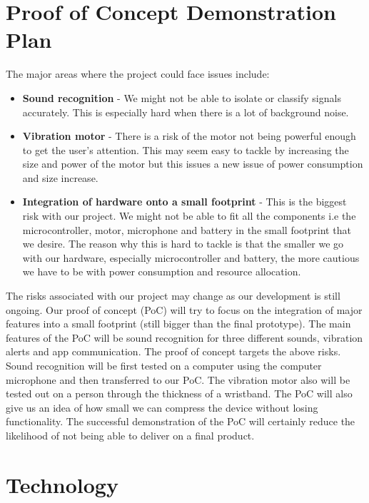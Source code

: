 \documentclass{article}
\begin{document}
\section{Proof of Concept Demonstration Plan}

The major areas where the project could face issues include: 
\begin{itemize}
	\item \textbf{Sound recognition} - We might not be able to isolate or classify signals accurately. This is especially hard when there is a lot of background noise. 
	\item \textbf{Vibration motor} - There is a risk of the motor not being powerful enough to get the user’s attention. This may seem easy to tackle by increasing the size and power of the motor but this issues a new issue of power consumption and size increase.
	\item \textbf{Integration of hardware onto a small footprint} - This is the biggest risk with our project. We might not be able to fit all the components i.e the microcontroller, motor, microphone and battery in the small footprint that we desire. The reason why this is hard to tackle is that the smaller we go with our hardware, especially microcontroller and battery, the more cautious we have to be with power consumption and resource allocation. 
\end{itemize} 
The risks associated with our project may change as our development is still ongoing. 
Our proof of concept (PoC) will try to focus on the integration of major features into a small footprint (still bigger than the final prototype). The main features of the PoC will be sound recognition for three different sounds, vibration alerts and app communication. The proof of concept targets the above risks. Sound recognition will be first tested on a computer using the computer microphone and then transferred to our PoC. The vibration motor also will be tested out on a person through the thickness of a wristband. The PoC will also give us an idea of how small we can compress the device without losing functionality. The successful demonstration of the PoC will certainly reduce the likelihood of not being able to deliver on a final product.


\section{Technology}
\end{document}
